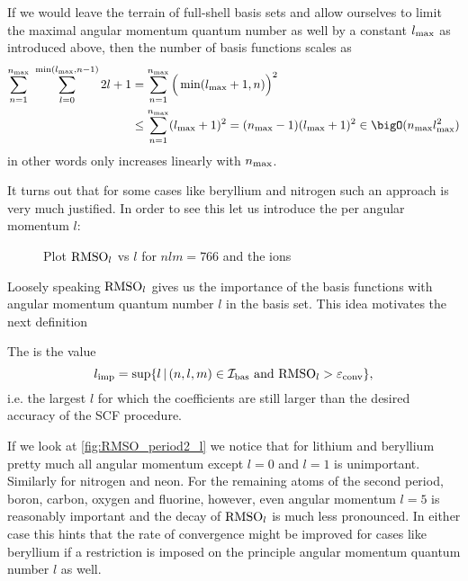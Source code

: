 





If we would leave the terrain of full-shell basis sets
and allow ourselves to limit the maximal angular momentum quantum
number as well by a constant $l_\text{max}$ as introduced above,
then the number of basis functions scales as
\begin{align*}
\sum_{n=1}^{\nmax} \ \sum_{l=0}^{\min(\lmax, n-1)} 2l + 1
	&= \sum_{n=1}^{\nmax} \Big( \min(\lmax+1, n) \Big)^2 \\
	&\le \sum_{n=1}^{\nmax} (\lmax+1)^2 = (\nmax-1) (\lmax+1)^2
	\in \bigO(\nmax \lmax^2)
\end{align*}
in other words only increases linearly with $n_\text{max}$.

It turns out that for some cases like beryllium and nitrogen
such an approach is very much justified.
In order to see this let us introduce the
per angular momentum $l$:

\begin{figure}
	\centering
	\caption{Plot $\text{RMSO}_l$ vs $l$ for $nlm = 766$ and the ions}
	\label{fig:RMSOl_ions}
\end{figure}

Loosely speaking $\text{RMSO}_l$ gives us the importance of the basis functions
with angular momentum quantum number $l$ in the \CS basis set.
This idea motivates the next definition

\begin{defn}
	The  is the value
	\[ l_\text{imp} = \sup \{ l \, | \, (n,l,m) \in \mathcal{I}_\text{bas} \ \text{and} \ \text{RMSO}_l > \varepsilon_\text{conv} \}, \]
	i.e. the largest $l$ for which the coefficients are still larger than the
	desired accuracy of the SCF procedure.
\end{defn}

If we look at \vref{fig:RMSO_period2_l} we notice
that for lithium and beryllium pretty much all angular momentum
except $l = 0$ and $l = 1$ is unimportant.
Similarly for nitrogen and neon.
For the remaining atoms of the second period,
boron, carbon, oxygen and fluorine, however,
even angular momentum $l=5$ is reasonably important and the
decay of $\text{RMSO}_l$ is much less pronounced.
In either case this hints that the rate of convergence might
be improved for cases like beryllium
if a restriction is imposed on the principle angular momentum
quantum number $l$ as well.

